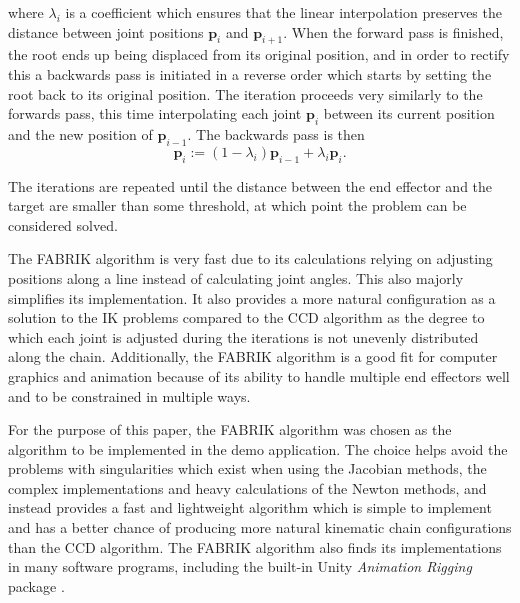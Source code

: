 \noindent where \(\lambda_i\) is a coefficient which ensures that the linear interpolation
preserves the distance between joint positions \(\mathbf{p}_i\) and
\(\mathbf{p}_{i+1}\). When the forward pass is finished, the root ends up being
displaced from its original position, and in order to rectify this a backwards
pass is initiated in a reverse order which starts by setting the root back to
its original position. The iteration proceeds very similarly to the forwards
pass, this time interpolating each joint \(\mathbf{p}_i\) between its current
position and the new position of \(\mathbf{p}_{i-1}\). The backwards pass is then
\begin{equation}
    \mathbf{p}_i := (1 - \lambda_i)\mathbf{p}_{i-1} + \lambda_i \mathbf{p}_i.
\end{equation}

The iterations are repeated until the distance between the end effector and the
target are smaller than some threshold, at which point the problem can be
considered solved.

The FABRIK algorithm is very fast due to its calculations relying on adjusting
positions along a line instead of calculating joint angles. This also majorly
simplifies its implementation. It also provides a more natural configuration as
a solution to the IK problems compared to the CCD algorithm as the degree to
which each joint is adjusted during the iterations is not unevenly distributed
along the chain. Additionally, the FABRIK algorithm is a good fit for computer
graphics and animation because of its ability to handle multiple end effectors
well and to be constrained in multiple ways.

For the purpose of this paper, the FABRIK algorithm was chosen as the
algorithm to be implemented in the demo application. The choice helps avoid the
problems with singularities which exist when using the Jacobian methods, the
complex implementations and heavy calculations of the Newton methods, and
instead provides a fast and lightweight algorithm which is simple to implement
and has a better chance of producing more natural kinematic chain configurations
than the CCD algorithm. The FABRIK algorithm also finds its implementations in
many software programs, including the built-in Unity \textit{Animation Rigging}
package \cite{unity_animation_rigging}.

